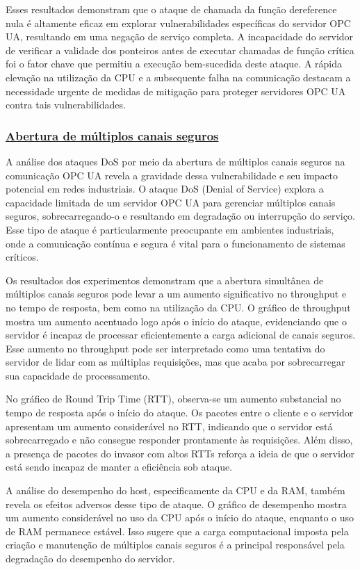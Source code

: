 Esses resultados demonstram que o ataque de chamada da função dereference nula é altamente eficaz em explorar vulnerabilidades específicas do servidor OPC UA, resultando em uma negação de serviço completa. A incapacidade do servidor de verificar a validade dos ponteiros antes de executar chamadas de função crítica foi o fator chave que permitiu a execução bem-sucedida deste ataque. A rápida elevação na utilização da CPU e a subsequente falha na comunicação destacam a necessidade urgente de medidas de mitigação para proteger servidores OPC UA contra tais vulnerabilidades.

\subsubsection*{\underline{Abertura de múltiplos canais seguros}}

A análise dos ataques DoS por meio da abertura de múltiplos canais seguros na comunicação OPC UA revela a gravidade dessa vulnerabilidade e seu impacto potencial em redes industriais. O ataque DoS (Denial of Service) explora a capacidade limitada de um servidor OPC UA para gerenciar múltiplos canais seguros, sobrecarregando-o e resultando em degradação ou interrupção do serviço. Esse tipo de ataque é particularmente preocupante em ambientes industriais, onde a comunicação contínua e segura é vital para o funcionamento de sistemas críticos.

Os resultados dos experimentos demonstram que a abertura simultânea de múltiplos canais seguros pode levar a um aumento significativo no throughput e no tempo de resposta, bem como na utilização da CPU. O gráfico de throughput mostra um aumento acentuado logo após o início do ataque, evidenciando que o servidor é incapaz de processar eficientemente a carga adicional de canais seguros. Esse aumento no throughput pode ser interpretado como uma tentativa do servidor de lidar com as múltiplas requisições, mas que acaba por sobrecarregar sua capacidade de processamento.

No gráfico de Round Trip Time (RTT), observa-se um aumento substancial no tempo de resposta após o início do ataque. Os pacotes entre o cliente e o servidor apresentam um aumento considerável no RTT, indicando que o servidor está sobrecarregado e não consegue responder prontamente às requisições. Além disso, a presença de pacotes do invasor com altos RTTs reforça a ideia de que o servidor está sendo incapaz de manter a eficiência sob ataque.

A análise do desempenho do host, especificamente da CPU e da RAM, também revela os efeitos adversos desse tipo de ataque. O gráfico de desempenho mostra um aumento considerável no uso da CPU após o início do ataque, enquanto o uso de RAM permanece estável. Isso sugere que a carga computacional imposta pela criação e manutenção de múltiplos canais seguros é a principal responsável pela degradação do desempenho do servidor.

